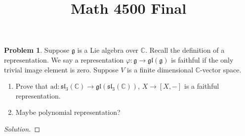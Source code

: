 \documentclass{article}
\title{Math 4500 Final}
\date{}
\theoremstyle{definition}
\newtheorem{problem}{Problem}
\theoremstyle{plain}
\begin{document}
\maketitle\par

\begin{problem}
Suppose $\mathfrak{g}$ is a Lie algebra over $\mathbb{C}$. Recall the definition of a representation. We say a representation $\varphi:\mathfrak{g}\to\mathfrak{gl}(\mathfrak{g})$ is faithful if the only trivial image element is zero. Suppose $V$ is a finite dimensional $\mathbb{C}$-vector space.
\begin{enumerate}
\item Prove that $\mathrm{ad}:\mathfrak{sl}_3(\mathbb{C})\to\mathfrak{gl}(\mathfrak{sl}_3(\mathbb{C}))$, $X\to[X,-]$ is a faithful representation.
\item Maybe polynomial representation?
\end{enumerate}
\end{problem}
\begin{adjustwidth}{0.7cm}{}
\color{blue}
\begin{proof}[Solution]
\color{black}
\end{proof}
\end{adjustwidth}
\end{document}
